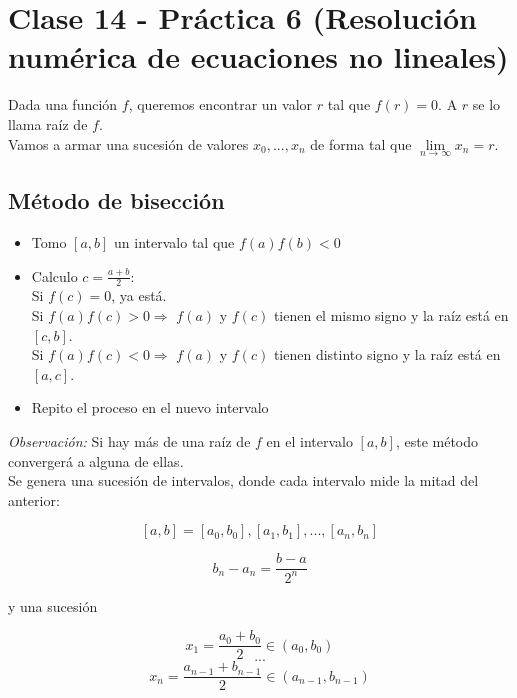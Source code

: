 \section{Clase 14 - Pr\'actica 6 (Resoluci\'on num\'erica de ecuaciones no lineales)}

Dada una funci\'on $f$, queremos encontrar un valor $r$ tal que $f(r) = 0$. A $r$ se lo llama ra\'iz de $f$.\\

Vamos a armar una sucesi\'on de valores $x_{0}, ..., x_{n}$ de forma tal que $\lim\limits_{n \to \infty}{x_{n}} = r$.

\subsection{M\'etodo de bisecci\'on}

\begin{itemize}
    \item Tomo $[a, b]$ un intervalo tal que $f(a)f(b) < 0$

    \item Calculo $c = \frac{a + b}{2}$:\\

    Si $f(c) = 0$, ya est\'a.\\
    
    Si $f(a)f(c) > 0 \Rightarrow$ $f(a)$ y $f(c)$ tienen el mismo signo y la ra\'iz est\'a en $[c, b]$.\\
    
    Si $f(a)f(c) < 0 \Rightarrow$ $f(a)$ y $f(c)$ tienen distinto signo y la ra\'iz est\'a en $[a, c]$.\\

    \item Repito el proceso en el nuevo intervalo
\end{itemize}

\textit{Observaci\'on:} Si hay m\'as de una ra\'iz de $f$ en el intervalo $[a, b]$, este m\'etodo converger\'a a alguna de ellas.\\

Se genera una sucesi\'on de intervalos, donde cada intervalo mide la mitad del anterior:

$$[a, b] = [a_{0}, b_{0}], [a_{1}, b_{1}], ..., [a_{n}, b_{n}]$$

$$b_{n} - a_{n} = \frac{b - a}{2^{n}}$$

y una sucesi\'on

$$x_{1} = \frac{a_{0} + b_{0}}{2} \in (a_{0}, b_{0})$$
$$...$$
$$x_{n} = \frac{a_{n - 1} + b_{n - 1}}{2} \in (a_{n - 1}, b_{n - 1})$$\\

